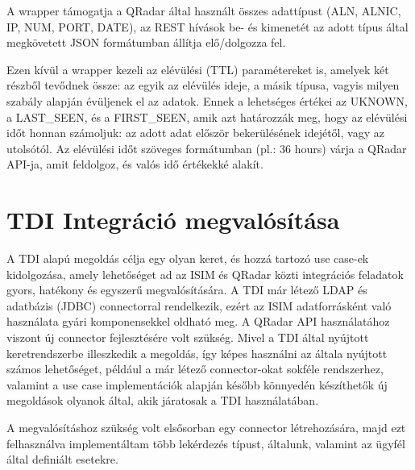 A wrapper támogatja a QRadar által használt összes adattípust (ALN, ALNIC, IP, NUM, PORT, DATE), az REST hívások be- és kimenetét az adott típus által megkövetett JSON formátumban állítja elő/dolgozza fel.


Ezen kívül a wrapper kezeli az elévülési (TTL) paramétereket is, amelyek két részből tevődnek össze: az egyik az elévülés ideje, a másik típusa, vagyis milyen szabály alapján évüljenek el az adatok. Ennek a lehetséges értékei az UKNOWN, a LAST\_SEEN, és a FIRST\_SEEN, amik azt határozzák meg, hogy az elévülési időt honnan számoljuk: az adott adat először bekerülésének idejétől, vagy az utolsótól. Az elévülési időt szöveges formátumban (pl.: 36 hours) várja a QRadar API-ja, amit feldolgoz, és valós idő értékekké alakít.


\section{TDI Integráció megvalósítása}
A TDI alapú megoldás célja egy olyan keret, és hozzá tartozó use case-ek kidolgozása, amely lehetőséget ad az ISIM és QRadar közti integrációs feladatok gyors, hatékony és egyszerű megvalósítására. 
A TDI már létező LDAP és adatbázis (JDBC) connectorral rendelkezik, ezért az ISIM adatforrásként való használata gyári komponensekkel oldható meg. A QRadar API használatához viszont új connector fejlesztésére volt szükség.
Mivel a TDI által nyújtott keretrendszerbe illeszkedik a megoldás, így képes használni az általa nyújtott számos lehetőséget, például a már létező connector-okat sokféle rendszerhez, valamint a use case implementációk alapján később könnyedén készíthetők új megoldások olyanok által, akik járatosak a TDI használatában. 

A megvalósításhoz szükség volt elsősorban egy connector létrehozására, majd ezt felhasználva implementáltam több lekérdezés típust, általunk, valamint az ügyfél által definiált esetekre.
 
